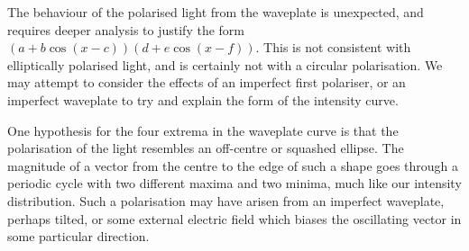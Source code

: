 \documentclass[11pt]{article}
\begin{document}
        The behaviour of the polarised light from the waveplate is unexpected, and requires deeper analysis to justify the form
        $(a + b\cos(x - c))(d + e\cos(x - f))$. This is not consistent with elliptically polarised light, and is certainly not with a circular
        polarisation. We may attempt to consider the effects of an imperfect first polariser, or an imperfect waveplate to try and explain
        the form of the intensity curve.

        One hypothesis for the four extrema in the waveplate curve is that the polarisation of the light resembles an off-centre or squashed ellipse.
        The magnitude of a vector from the centre to the edge of such a shape goes through a periodic cycle with two different maxima and
        two minima, much like our intensity distribution. Such a polarisation may have arisen from an imperfect waveplate, perhaps tilted,
        or some external electric field which biases the oscillating vector in some particular direction.
        
        
\end{document}

